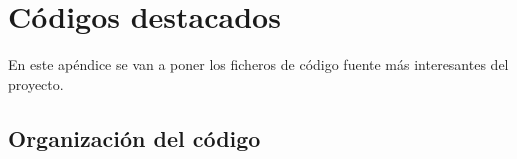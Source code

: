 \chapter{Códigos destacados} 

En este apéndice se van a poner los ficheros de código fuente más interesantes del proyecto.

\section{Organización del código}





\lstset{language=C++,tabsize=2,basicstyle=\tiny,numbers=left}


